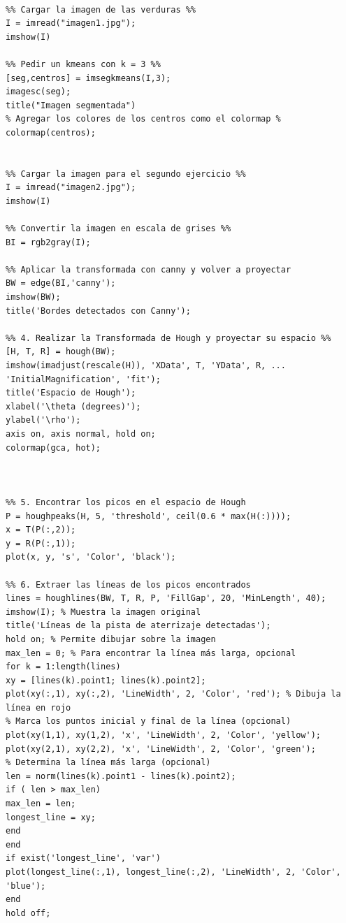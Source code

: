 \documentclass[11pt, letterpaper]{article}
\begin{document}
\begin{verbatim}

%% Cargar la imagen de las verduras %%
I = imread("imagen1.jpg");
imshow(I)

%% Pedir un kmeans con k = 3 %%
[seg,centros] = imsegkmeans(I,3);
imagesc(seg);
title("Imagen segmentada")
% Agregar los colores de los centros como el colormap %
colormap(centros);


%% Cargar la imagen para el segundo ejercicio %%
I = imread("imagen2.jpg");
imshow(I)

%% Convertir la imagen en escala de grises %%
BI = rgb2gray(I);

%% Aplicar la transformada con canny y volver a proyectar
BW = edge(BI,'canny');
imshow(BW);
title('Bordes detectados con Canny');

%% 4. Realizar la Transformada de Hough y proyectar su espacio %%
[H, T, R] = hough(BW);
imshow(imadjust(rescale(H)), 'XData', T, 'YData', R, ...
'InitialMagnification', 'fit');
title('Espacio de Hough');
xlabel('\theta (degrees)');
ylabel('\rho');
axis on, axis normal, hold on;
colormap(gca, hot); 



%% 5. Encontrar los picos en el espacio de Hough
P = houghpeaks(H, 5, 'threshold', ceil(0.6 * max(H(:))));
x = T(P(:,2));
y = R(P(:,1));
plot(x, y, 's', 'Color', 'black');

%% 6. Extraer las líneas de los picos encontrados
lines = houghlines(BW, T, R, P, 'FillGap', 20, 'MinLength', 40);
imshow(I); % Muestra la imagen original
title('Líneas de la pista de aterrizaje detectadas');
hold on; % Permite dibujar sobre la imagen
max_len = 0; % Para encontrar la línea más larga, opcional
for k = 1:length(lines)
xy = [lines(k).point1; lines(k).point2];
plot(xy(:,1), xy(:,2), 'LineWidth', 2, 'Color', 'red'); % Dibuja la línea en rojo
% Marca los puntos inicial y final de la línea (opcional)
plot(xy(1,1), xy(1,2), 'x', 'LineWidth', 2, 'Color', 'yellow');
plot(xy(2,1), xy(2,2), 'x', 'LineWidth', 2, 'Color', 'green');
% Determina la línea más larga (opcional)
len = norm(lines(k).point1 - lines(k).point2);
if ( len > max_len)
max_len = len;
longest_line = xy;
end
end
if exist('longest_line', 'var')
plot(longest_line(:,1), longest_line(:,2), 'LineWidth', 2, 'Color', 'blue');
end
hold off;

\end{verbatim}
\end{document}
